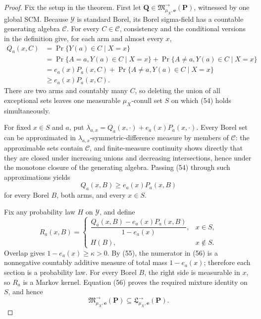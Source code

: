 \documentclass{article}
\begin{document}
\begin{proof}
Fix the setup in the theorem.  First let \(\boldsymbol Q\in\mathfrak M^{\to}_{\mu_X,\boldsymbol e}(\boldsymbol P)\), witnessed by one global SCM.  Because \(\mathcal Y\) is standard Borel, its Borel sigma-field has a countable generating algebra \(\mathcal C\).  For every \(C\in\mathcal C\), consistency and the conditional versions in the definition give, for each arm and almost every \(x\),
\[
 \begin{aligned}
 Q_a(x,C)
 &=\Pr\{Y(a)\in C\mid X=x\}\\
 &=\Pr\{A=a,Y(a)\in C\mid X=x\}
   +\Pr\{A\ne a,Y(a)\in C\mid X=x\}\\
 &=e_a(x)P_a(x,C)
   +\Pr\{A\ne a,Y(a)\in C\mid X=x\}\\
 &\ge e_a(x)P_a(x,C).
 \end{aligned} \tag{54}
\]
There are two arms and countably many \(C\), so deleting the union of all exceptional sets leaves one measurable \(\mu_X\)-conull set \(S\) on which (54) holds simultaneously.

For fixed \(x\in S\) and \(a\), put \(\lambda_{a,x}=Q_a(x,\cdot)+e_a(x)P_a(x,\cdot)\).  Every Borel set can be approximated in \(\lambda_{a,x}\)-symmetric-difference measure by members of \(\mathcal C\): the approximable sets contain \(\mathcal C\), and finite-measure continuity shows directly that they are closed under increasing unions and decreasing intersections, hence under the monotone closure of the generating algebra.  Passing (54) through such approximations yields
\[
 Q_a(x,B)\ge e_a(x)P_a(x,B) \tag{55}
\]
for every Borel \(B\), both arms, and every \(x\in S\).

Fix any probability law \(H\) on \(\mathcal Y\), and define
\[
 R_a(x,B)=
 \begin{cases}
 \dfrac{Q_a(x,B)-e_a(x)P_a(x,B)}{1-e_a(x)},&x\in S,\\[6pt]
 H(B),&x\notin S.
 \end{cases} \tag{56}
\]
Overlap gives \(1-e_a(x)\ge\kappa>0\).  By (55), the numerator in (56) is a nonnegative countably additive measure of total mass \(1-e_a(x)\); therefore each section is a probability law.  For every Borel \(B\), the right side is measurable in \(x\), so \(R_a\) is a Markov kernel.  Equation (56) proves the required mixture identity on \(S\), and hence
\[
 \mathfrak M^{\to}_{\mu_X,\boldsymbol e}(\boldsymbol P)
 \subseteq\mathfrak L^{\to}_{\mu_X,\boldsymbol e}(\boldsymbol P). \tag{57}
\]


\end{proof}
\end{document}
